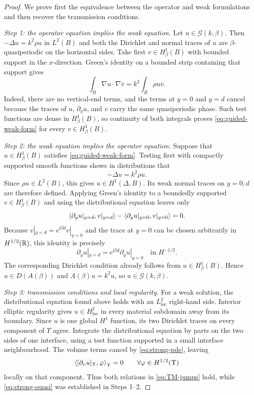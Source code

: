 \begin{proof}
We prove first the equivalence between the operator and weak formulations and
then recover the transmission conditions.

\emph{Step 1: the operator equation implies the weak equation.}
Let $u\in\mathcal G(k,\beta)$.  Then
$-\Delta u=k^2\rho u$ in $L^2(B)$ and both the Dirichlet and normal traces of
$u$ are $\beta$-quasiperiodic on the horizontal sides.  Take first
$v\in H^1_\beta(B)$ with bounded support in the $x$-direction.  Green's
identity on a bounded strip containing that support gives
\[
  \int_B\nabla u\cdot\nabla\overline v
  =k^2\int_B\rho u\overline v.
\]
Indeed, there are no vertical-end terms, and the terms at $y=0$ and $y=d$
cancel because the traces of $u$, $\partial_yu$, and $v$ carry the same
quasiperiodic phase.  Such test functions are dense in $H^1_\beta(B)$, so
continuity of both integrals proves \eqref{eq:guided-weak-form} for every
$v\in H^1_\beta(B)$.

\emph{Step 2: the weak equation implies the operator equation.}
Suppose that $u\in H^1_\beta(B)$ satisfies
\eqref{eq:guided-weak-form}.  Testing first with compactly supported smooth
functions shows in distributions that
\[
  -\Delta u=k^2\rho u.
\]
Since $\rho u\in L^2(B)$, this gives $u\in H^1(\Delta,B)$.  Its weak normal
traces on $y=0,d$ are therefore defined.  Applying Green's identity to a
boundedly supported $v\in H^1_\beta(B)$ and using the distributional equation
leaves only
\[
  \left\langle \partial_yu|_{y=d},v|_{y=d}\right\rangle
  -\left\langle \partial_yu|_{y=0},v|_{y=0}\right\rangle=0.
\]
Because $v|_{y=d}=e^{\ii\beta d}v|_{y=0}$ and the trace at $y=0$ can be
chosen arbitrarily in $H^{1/2}(\mathbb{R})$, this identity is precisely
\[
  \partial_yu|_{y=d}
  =e^{\ii\beta d}\partial_yu|_{y=0}
  \quad\text{in }H^{-1/2}.
\]
The corresponding Dirichlet condition already follows from
$u\in H^1_\beta(B)$.  Hence $u\in D(A(\beta))$ and
$A(\beta)u=k^2u$, so $u\in\mathcal G(k,\beta)$.

\emph{Step 3: transmission conditions and local regularity.}
For a weak solution, the distributional equation found above holds with an
$L^2_{\mathrm{loc}}$ right-hand side.  Interior elliptic regularity gives
$u\in H^2_{\mathrm{loc}}$ in every material subdomain away from its boundary.
Since $u$ is one global $H^1$ function, its two Dirichlet traces on every
component of $\Upsilon$ agree.  Integrate the distributional equation by
parts on the two sides of one interface, using a test function supported in a
small interface neighbourhood.  The volume terms cancel by
\eqref{eq:strong-pde}, leaving
\[
  \left\langle [\partial_\nu u]_{\Upsilon},\varphi\right\rangle_{\Upsilon}=0
  \qquad\forall\varphi\in H^{1/2}(\Upsilon)
\]
locally on that component.  Thus both relations in
\eqref{eq:TM-jumps} hold, while \eqref{eq:strong-quasi} was established in
Steps 1--2.


\end{proof}
